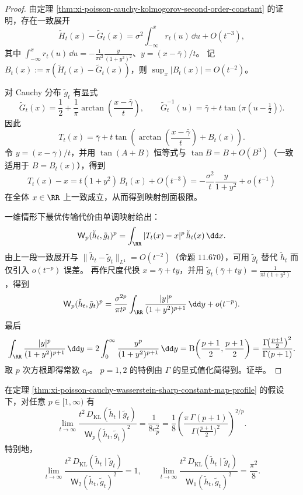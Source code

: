 \begin{proof}
由定理 \ref{thm:xi-poisson-cauchy-kolmogorov-second-order-constant} 的证明，存在一致展开
\[
\tilde H_t(x)-\tilde G_t(x)=\sigma^2\int_{-\infty}^{x}r_t(u)\,\dd u+O(t^{-3}),
\]
其中 \(\int_{-\infty}^{x}r_t(u)\,\dd u=-\frac{1}{\pi t^2}\frac{y}{(1+y^2)^2}\)、\(y=(x-\bar\gamma)/t\)。
记
\(
B_t(x):=\pi(\tilde H_t(x)-\tilde G_t(x))
\)，则 \(\sup_x|B_t(x)|=O(t^{-2})\)。
\par
对 Cauchy 分布 \(\tilde g_t\) 有显式
\[
\tilde G_t(x)=\frac12+\frac1\pi\arctan\!\left(\frac{x-\bar\gamma}{t}\right),
\qquad
\tilde G_t^{-1}(u)=\bar\gamma+t\tan\!\bigl(\pi(u-\tfrac12)\bigr).
\]
因此
\[
T_t(x)=\bar\gamma+t\tan\!\left(\arctan\!\left(\frac{x-\bar\gamma}{t}\right)+B_t(x)\right).
\]
令 \(y=(x-\bar\gamma)/t\)，并用 \(\tan(A+B)\) 恒等式与 \(\tan B=B+O(B^3)\)（一致适用于 \(B=B_t(x)\)），得到
\[
T_t(x)-x
=t(1+y^2)\,B_t(x)+O(t^{-3})
=-\frac{\sigma^2}{t}\frac{y}{1+y^2}+o(t^{-1})
\]
在全体 \(x\in\RR\) 上一致成立，从而得到映射剖面极限。
\par
一维情形下最优传输代价由单调映射给出：
\[
\mathsf W_p(\tilde h_t,\tilde g_t)^p=\int_{\RR}|T_t(x)-x|^p\,\tilde h_t(x)\,\dd x.
\]
由上一段一致展开与 \(\|\tilde h_t-\tilde g_t\|_{L^1}=O(t^{-2})\)（命题 \(11.670\)），可用 \(\tilde g_t\) 替代 \(\tilde h_t\) 而仅引入 \(o(t^{-p})\) 误差。
再作尺度代换 \(x=\bar\gamma+ty\)，并用 \(\tilde g_t(\bar\gamma+ty)=\frac{1}{\pi t(1+y^2)}\)，得到
\[
\mathsf W_p(\tilde h_t,\tilde g_t)^p
=\frac{\sigma^{2p}}{\pi t^p}\int_{\RR}\frac{|y|^p}{(1+y^2)^{p+1}}\,\dd y+o(t^{-p}).
\]
最后
\[
\int_{\RR}\frac{|y|^p}{(1+y^2)^{p+1}}\,\dd y
=2\int_0^\infty\frac{y^p}{(1+y^2)^{p+1}}\,\dd y
=\mathrm B\!\left(\frac{p+1}{2},\frac{p+1}{2}\right)
=\frac{\Gamma\!\bigl(\frac{p+1}{2}\bigr)^2}{\Gamma(p+1)}.
\]
取 \(p\) 次方根即得常数 \(c_p\)。
\(p=1,2\) 的特例由 \(\Gamma\) 的显式值化简得到。证毕。
\end{proof}

\begin{corollary}\label{cor:xi-poisson-cauchy-kl-wasserstein-calibration}
在定理 \ref{thm:xi-poisson-cauchy-wasserstein-sharp-constant-map-profile} 的假设下，对任意 \(p\in[1,\infty)\) 有
\[
\lim_{t\to\infty}\frac{t^2\,D_{\mathrm{KL}}(\tilde h_t\mid \tilde g_t)}{\mathsf W_p(\tilde h_t,\tilde g_t)^2}
=\frac{1}{8c_p^2}
=\frac18\left(\frac{\pi\,\Gamma(p+1)}{\Gamma\!\bigl(\frac{p+1}{2}\bigr)^2}\right)^{2/p}.
\]
特别地，
\[
\lim_{t\to\infty}\frac{t^2\,D_{\mathrm{KL}}(\tilde h_t\mid \tilde g_t)}{\mathsf W_2(\tilde h_t,\tilde g_t)^2}=1,
\qquad
\lim_{t\to\infty}\frac{t^2\,D_{\mathrm{KL}}(\tilde h_t\mid \tilde g_t)}{\mathsf W_1(\tilde h_t,\tilde g_t)^2}=\frac{\pi^2}{8}.
\]
\end{corollary}

